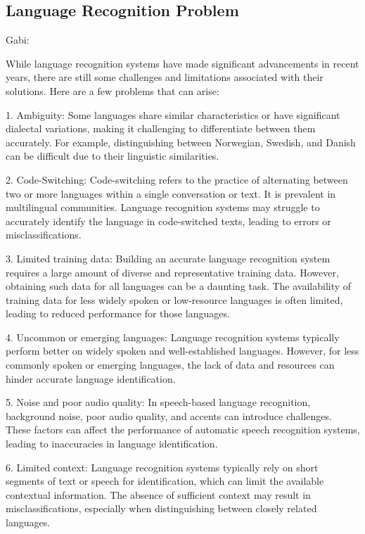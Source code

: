 \documentclass[a4paper]{article}
\begin{document}
\subsection{Language Recognition Problem}

Gabi:

While language recognition systems have made significant advancements in recent years, there are still some challenges and limitations associated with their solutions. Here are a few problems that can arise:

1. Ambiguity: Some languages share similar characteristics or have significant dialectal variations, making it challenging to differentiate between them accurately. For example, distinguishing between Norwegian, Swedish, and Danish can be difficult due to their linguistic similarities.

2. Code-Switching: Code-switching refers to the practice of alternating between two or more languages within a single conversation or text. It is prevalent in multilingual communities. Language recognition systems may struggle to accurately identify the language in code-switched texts, leading to errors or misclassifications.

3. Limited training data: Building an accurate language recognition system requires a large amount of diverse and representative training data. However, obtaining such data for all languages can be a daunting task. The availability of training data for less widely spoken or low-resource languages is often limited, leading to reduced performance for those languages.

4. Uncommon or emerging languages: Language recognition systems typically perform better on widely spoken and well-established languages. However, for less commonly spoken or emerging languages, the lack of data and resources can hinder accurate language identification.

5. Noise and poor audio quality: In speech-based language recognition, background noise, poor audio quality, and accents can introduce challenges. These factors can affect the performance of automatic speech recognition systems, leading to inaccuracies in language identification.

6. Limited context: Language recognition systems typically rely on short segments of text or speech for identification, which can limit the available contextual information. The absence of sufficient context may result in misclassifications, especially when distinguishing between closely related languages.
\end{document}
